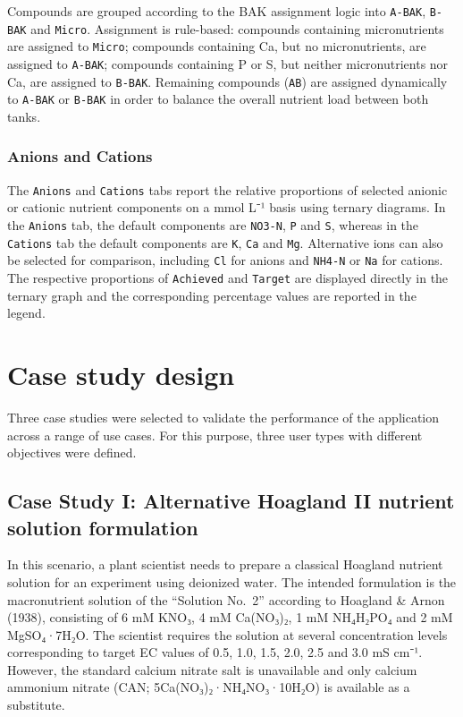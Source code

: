 \documentclass[
  letterpaper,
  DIV=11,
  numbers=noendperiod]{scrreprt}
\begin{document}
Compounds are grouped according to the BAK assignment logic into
\texttt{A-BAK}, \texttt{B-BAK} and \texttt{Micro}. Assignment is
rule-based: compounds containing micronutrients are assigned to
\texttt{Micro}; compounds containing Ca, but no micronutrients, are
assigned to \texttt{A-BAK}; compounds containing P or S, but neither
micronutrients nor Ca, are assigned to \texttt{B-BAK}. Remaining
compounds (\texttt{AB}) are assigned dynamically to \texttt{A-BAK} or
\texttt{B-BAK} in order to balance the overall nutrient load between
both tanks.

\subsubsection{Anions and Cations}\label{anions-and-cations}

The \texttt{Anions} and \texttt{Cations} tabs report the relative
proportions of selected anionic or cationic nutrient components on a
mmol L⁻¹ basis using ternary diagrams. In the \texttt{Anions} tab, the
default components are \texttt{NO3-N}, \texttt{P} and \texttt{S},
whereas in the \texttt{Cations} tab the default components are
\texttt{K}, \texttt{Ca} and \texttt{Mg}. Alternative ions can also be
selected for comparison, including \texttt{Cl} for anions and
\texttt{NH4-N} or \texttt{Na} for cations. The respective proportions of
\texttt{Achieved} and \texttt{Target} are displayed directly in the
ternary graph and the corresponding percentage values are reported in
the legend.

\section{Case study design}\label{case-study-design}

Three case studies were selected to validate the performance of the
application across a range of use cases. For this purpose, three user
types with different objectives were defined.

\subsection{Case Study I: Alternative Hoagland II nutrient solution
formulation}\label{case-study-i-alternative-hoagland-ii-nutrient-solution-formulation}

In this scenario, a plant scientist needs to prepare a classical
Hoagland nutrient solution for an experiment using deionized water. The
intended formulation is the macronutrient solution of the ``Solution
No.~2'' according to Hoagland \& Arnon (1938), consisting of 6 mM KNO₃,
4 mM Ca(NO₃)₂, 1 mM NH₄H₂PO₄ and 2 mM MgSO₄·7H₂O. The scientist requires
the solution at several concentration levels corresponding to target EC
values of 0.5, 1.0, 1.5, 2.0, 2.5 and 3.0 mS cm⁻¹. However, the standard
calcium nitrate salt is unavailable and only calcium ammonium nitrate
(CAN; 5Ca(NO₃)₂·NH₄NO₃·10H₂O) is available as a substitute.
\end{document}
